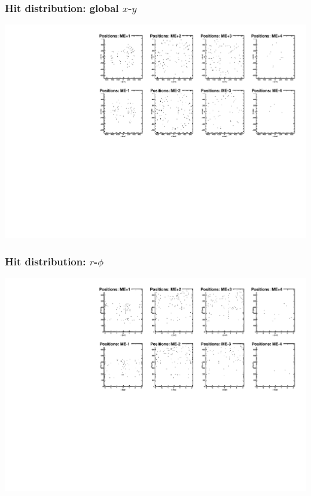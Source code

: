 \documentclass[compress]{beamer}
\begin{document}
\begin{frame}
\frametitle{Hit distribution: global $x$-$y$}

\includegraphics[width=\linewidth]{correctedinput_xypos.pdf}
\end{frame}

\begin{frame}
\frametitle{Hit distribution: $r$-$\phi$}

\includegraphics[width=\linewidth]{correctedinput_rphipos.pdf}
\end{frame}
\end{document}
